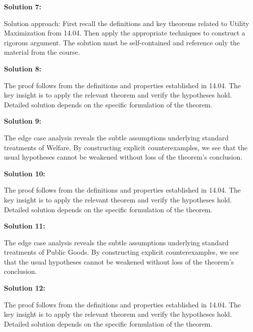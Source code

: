 \documentclass[12pt,a4paper]{exam}
\begin{document}
\vspace{0.5cm}

\textbf{Solution 7:}

Solution approach: First recall the definitions and key theorems related to Utility Maximization from 14.04. Then apply the appropriate techniques to construct a rigorous argument. The solution must be self-contained and reference only the material from the course.

\vspace{0.5cm}

\textbf{Solution 8:}

The proof follows from the definitions and properties established in 14.04. The key insight is to apply the relevant theorem and verify the hypotheses hold. Detailed solution depends on the specific formulation of the theorem.

\vspace{0.5cm}

\textbf{Solution 9:}

The edge case analysis reveals the subtle assumptions underlying standard treatments of Welfare. By constructing explicit counterexamples, we see that the usual hypotheses cannot be weakened without loss of the theorem's conclusion.

\vspace{0.5cm}

\textbf{Solution 10:}

The proof follows from the definitions and properties established in 14.04. The key insight is to apply the relevant theorem and verify the hypotheses hold. Detailed solution depends on the specific formulation of the theorem.

\vspace{0.5cm}

\textbf{Solution 11:}

The edge case analysis reveals the subtle assumptions underlying standard treatments of Public Goods. By constructing explicit counterexamples, we see that the usual hypotheses cannot be weakened without loss of the theorem's conclusion.

\vspace{0.5cm}

\textbf{Solution 12:}

The proof follows from the definitions and properties established in 14.04. The key insight is to apply the relevant theorem and verify the hypotheses hold. Detailed solution depends on the specific formulation of the theorem.
\end{document}
